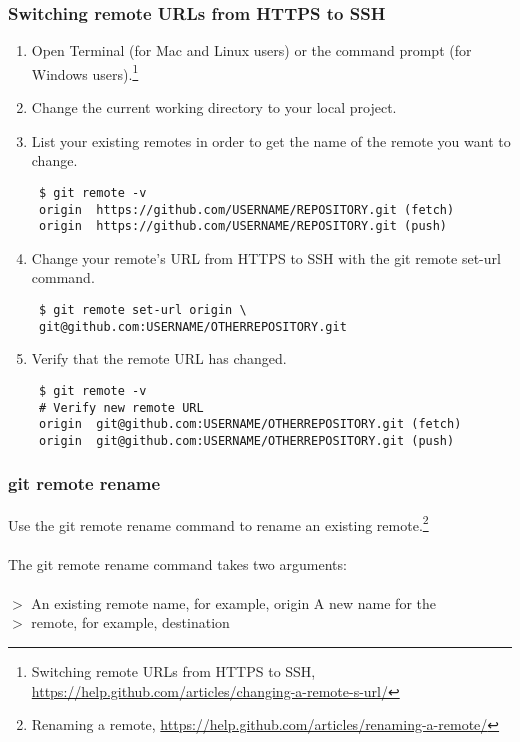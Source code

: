 \documentclass[12pt,letterpaper,dvips]{article}
\begin{document}
\subsubsection{Switching remote URLs from HTTPS to SSH}
\begin{enumerate}
  \item{Open Terminal (for Mac and Linux users) or the command prompt
       (for Windows users).\footnote{Switching remote URLs from HTTPS to SSH,
       \href{https://help.github.com/articles/changing-a-remote-s-url/}{https://help.github.com/articles/changing-a-remote-s-url/}}}
  \item{Change the current working directory to your local project.}
  \item{List your existing remotes in order to get the name of the remote you want to change.
\begin{Verbatim}
 $ git remote -v
 origin  https://github.com/USERNAME/REPOSITORY.git (fetch)
 origin  https://github.com/USERNAME/REPOSITORY.git (push)
\end{Verbatim}
       }
  \item{Change your remote's URL from HTTPS to SSH with the git remote set-url command.
\begin{Verbatim}
 $ git remote set-url origin \
 git@github.com:USERNAME/OTHERREPOSITORY.git
\end{Verbatim}
      }

  \item{Verify that the remote URL has changed.
\begin{Verbatim}
 $ git remote -v
 # Verify new remote URL
 origin  git@github.com:USERNAME/OTHERREPOSITORY.git (fetch)
 origin  git@github.com:USERNAME/OTHERREPOSITORY.git (push)
\end{Verbatim}
       }
\end{enumerate}


\subsubsection{git remote rename}
Use the git remote rename command to rename an existing remote.\footnote{Renaming a remote,
\href{https://help.github.com/articles/renaming-a-remote/}{https://help.github.com/articles/renaming-a-remote/}}
\\
\\
The git remote rename command takes two arguments:
\\
\\
$>$ An existing remote name, for example, origin A new name for the\\
$>$ remote, for example, destination
\end{document}

